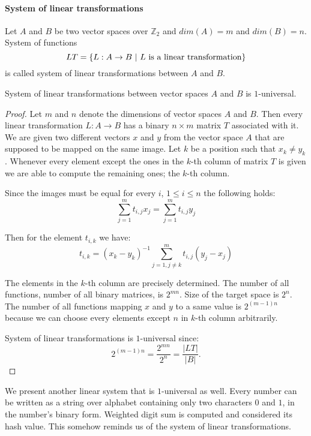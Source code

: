 \paragraph{System of linear transformations}
\begin{definition}
Let $A$ and $B$ be two vector spaces over $\mathbb{Z}_2$ and $dim(A) = m$ and $dim(B) = n$. System of functions \[ LT = \{L : A \rightarrow B \ | \  L \text{ is a linear transformation}\} \] is called system of linear transformations between $A$ and $B$.
\end{definition}
\begin{remark}
System of linear transformations between vector spaces $A$ and $B$ is $1$-universal.
\end{remark}
\begin{proof}
Let $m$ and $n$ denote the dimensions of vector spaces $A$ and $B$. Then every linear transformation $L: A \rightarrow B$ has a binary $n \times m$ matrix $T$ associated with it. We are given two different vectors $x$ and $y$ from the vector space $A$ that are supposed to be mapped on the same image. Let $k$ be a position such that $x_k \neq y_k$. Whenever every element except the ones in the $k$-th column of matrix $T$ is given we are able to compute the remaining ones; the $k$-th column. 

Since the images must be equal for every $i$, $1 \leq i \leq n$ the following holds:
\[
\displaystyle\sum_{j = 1}^{m}t_{i, j}x_j = \displaystyle\sum_{j = 1}^{m}t_{i, j}y_j
\]

Then for the element $t_{i, k}$ we have:
\[
t_{i, k} = (x_k - y_k)^{-1}\displaystyle\sum_{j = 1, j \neq k}^{m}t_{i, j}(y_j - x_j)
\]

The elements in the $k$-th column are precisely determined. The number of all functions, number of all binary matrices, is $2^{mn}$. Size of the target space is $2^n$. The number of all functions mapping $x$ and $y$ to a same value is $2^{(m-1)n}$ because we can choose every elements except $n$ in $k$-th column arbitrarily. 

System of linear transformations is $1$-universal since:
\[
2^{(m - 1)n} = \frac{2^{mn}}{2^n} = \frac{|LT|}{|B|} \textit{.}
\]
\end{proof}

We present another linear system that is $1$-universal as well. Every number can be written as a string over alphabet containing only two characters $0$ and $1$, in the number's binary form. Weighted digit sum is computed and considered its hash value. This somehow reminds us of the system of linear transformations.

